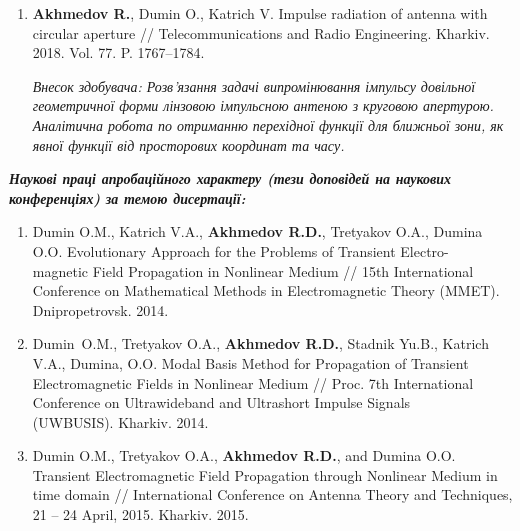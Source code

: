 {\begin{enumerate}
		\item \textbf{Akhmedov R.}, Dumin O., Katrich V. Impulse radiation of antenna 
		with circular aperture // Telecommunications and Radio Engineering. Kharkiv. 
		2018. Vol. 77. P. 1767--1784.
		
		\textit{Внесок здобувача: Розв'язання задачі випромінювання імпульсу довільної
			геометричної форми лінзовою імпульсною антеною з круговою апертурою. Аналітична
			робота по отриманню перехідної функції для ближньої зони, як явної функції 
			від просторових координат та часу.}
		
		\setcounter{ItemsInMyWriting}{\value{enumi}}
	\end{enumerate}
		
	
	\begin{center} 
		\textit{\textbf{Наукові праці апробаційного характеру (тези доповідей на 
				наукових конференціях) за темою дисертації:}}
	\end{center}
	
	\begin{enumerate}
		\setcounter{enumi}{\value{ItemsInMyWriting}}
		
		\item Dumin O.M., Katrich V.A., \textbf{Akhmedov R.D.}, Tretyakov O.A., 
		Dumina O.O. Evolutionary Approach for the Problems of Transient 
		Electro-\\magnetic Field Propagation in Nonlinear Medium // 15th International 
		Conference on Mathematical Methods in Electromagnetic Theory (MMET).
		Dnipropetrovsk. 2014.
		
		\item Dumin O.M., Tretyakov O.A., \textbf{Akhmedov R.D.}, Stadnik Yu.B., 
		Katrich V.A., Dumina, O.O. Modal Basis Method for Propagation of 
		Transient Electromagnetic Fields in Nonlinear Medium // Proc. 7th 
		International Conference on Ultrawideband and Ultrashort Impulse Signals \\
		(UWBUSIS). Kharkiv. 2014.
		
		\item Dumin O.M., Tretyakov O.A., \textbf{Akhmedov R.D.}, and Dumina O.O. 
		Transient Electromagnetic Field Propagation through Nonlinear Medium in 
		time domain // International Conference on Antenna Theory and Techniques, 
		21 -- 24 April, 2015. Kharkiv. 2015.
		

\end{enumerate}}
